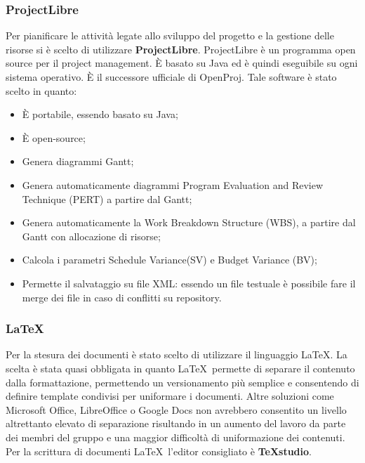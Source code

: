 \documentclass[../NormeDiProgetto.tex]{subfiles}
\begin{document}
			\subsubsection{ProjectLibre}
				Per pianificare le attività legate allo sviluppo del progetto e la gestione delle risorse si è scelto di utilizzare \textbf{ProjectLibre}.
				ProjectLibre è un programma open source per il project management. È basato su Java ed è quindi eseguibile su ogni sistema operativo. È il successore ufficiale di OpenProj. Tale software è stato scelto in quanto:
				\begin{itemize}
					\item È portabile, essendo basato su Java;
					\item È open-source;
					\item Genera diagrammi Gantt;
					\item Genera automaticamente diagrammi Program Evaluation and Review Technique (PERT) a partire dal Gantt;
					\item Genera automaticamente la Work Breakdown Structure (WBS), a partire dal Gantt con allocazione di risorse;
					\item Calcola i parametri Schedule Variance(SV) e Budget Variance (BV);
					\item Permette il salvataggio su file XML: essendo un file testuale è possibile fare il merge dei file in caso di conflitti su repository. 
				\end{itemize}
			\subsubsection{\LaTeX}
				Per la stesura dei documenti è stato scelto di utilizzare il linguaggio \LaTeX.
				La scelta è stata quasi obbligata in quanto \LaTeX\ permette di separare il contenuto dalla formattazione, permettendo un versionamento più semplice e consentendo di definire template condivisi per uniformare i documenti. Altre soluzioni come Microsoft Office, LibreOffice o Google Docs non avrebbero consentito un livello altrettanto elevato di separazione risultando in un aumento del lavoro da parte dei membri del gruppo e una maggior difficoltà di uniformazione dei contenuti.
				Per la scrittura di documenti \LaTeX\ l’editor consigliato è \textbf{TeXstudio}.
				
\end{document}
